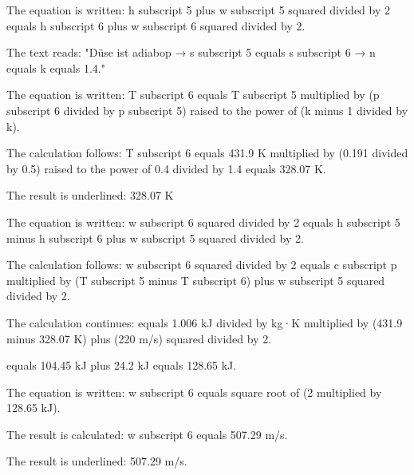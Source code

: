 The equation is written:  
h subscript 5 plus w subscript 5 squared divided by 2 equals h subscript 6 plus w subscript 6 squared divided by 2.  

The text reads:  
"Düse ist adiabop → s subscript 5 equals s subscript 6 → n equals k equals 1.4."  

The equation is written:  
T subscript 6 equals T subscript 5 multiplied by (p subscript 6 divided by p subscript 5) raised to the power of (k minus 1 divided by k).  

The calculation follows:  
T subscript 6 equals 431.9 K multiplied by (0.191 divided by 0.5) raised to the power of 0.4 divided by 1.4 equals 328.07 K.  

The result is underlined:  
328.07 K  

The equation is written:  
w subscript 6 squared divided by 2 equals h subscript 5 minus h subscript 6 plus w subscript 5 squared divided by 2.  

The calculation follows:  
w subscript 6 squared divided by 2 equals c subscript p multiplied by (T subscript 5 minus T subscript 6) plus w subscript 5 squared divided by 2.  

The calculation continues:  
equals 1.006 kJ divided by kg·K multiplied by (431.9 minus 328.07 K) plus (220 m/s) squared divided by 2.  

equals 104.45 kJ plus 24.2 kJ equals 128.65 kJ.  

The equation is written:  
w subscript 6 equals square root of (2 multiplied by 128.65 kJ).  

The result is calculated:  
w subscript 6 equals 507.29 m/s.  

The result is underlined:  
507.29 m/s.